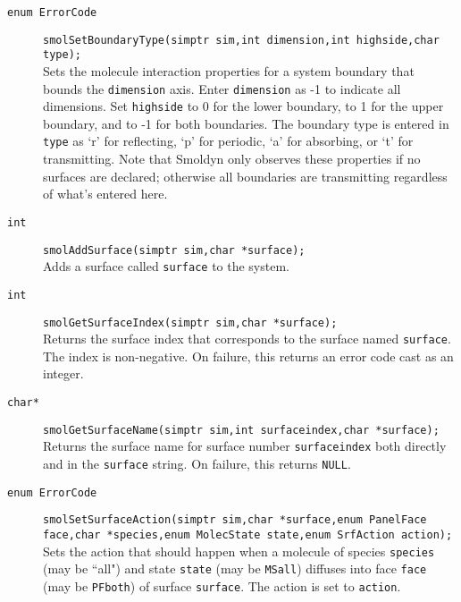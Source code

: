 \documentclass {book}
\begin{document}
\begin{description}

\item[\texttt{enum ErrorCode}]
\texttt{smolSetBoundaryType(simptr sim,int dimension,int highside,char type);}
\hfill \\
Sets the molecule interaction properties for a system boundary that bounds the \texttt{dimension} axis. Enter \texttt{dimension} as -1 to indicate all dimensions. Set \texttt{highside} to 0 for the lower boundary, to 1 for the upper boundary, and to -1 for both boundaries. The boundary type is entered in \texttt{type} as `r' for reflecting, `p' for periodic, `a' for absorbing, or `t' for transmitting. Note that Smoldyn only observes these properties if no surfaces are declared; otherwise all boundaries are transmitting regardless of what's entered here.

\item[\texttt{int}]
\texttt{smolAddSurface(simptr sim,char *surface);}
\hfill \\
Adds a surface called \texttt{surface} to the system.

\item[\texttt{int}]
\texttt{smolGetSurfaceIndex(simptr sim,char *surface);}
\hfill \\
Returns the surface index that corresponds to the surface named \texttt{surface}. The index is non-negative. On failure, this returns an error code cast as an integer.

\item[\texttt{char*}]
\texttt{smolGetSurfaceName(simptr sim,int surfaceindex,char *surface);}
\hfill \\
Returns the surface name for surface number \texttt{surfaceindex} both directly and in the \texttt{surface} string. On failure, this returns \texttt{NULL}.

\item[\texttt{enum ErrorCode}]
\texttt{smolSetSurfaceAction(simptr sim,char *surface,enum PanelFace face,char *species,enum MolecState state,enum SrfAction action);}
\hfill \\
Sets the action that should happen when a molecule of species \texttt{species} (may be ``all") and state \texttt{state} (may be \texttt{MSall}) diffuses into face \texttt{face} (may be \texttt{PFboth}) of surface \texttt{surface}. The action is set to \texttt{action}.


\end{description}
\end{document}
